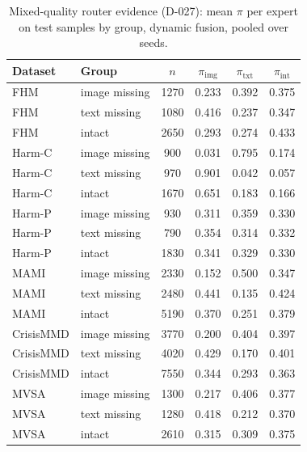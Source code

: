 \begin{table}[t]
\centering
\caption{Mixed-quality router evidence (D-027): mean $\pi$ per expert on test samples by group, dynamic fusion, pooled over seeds.}
\label{tab:mq-router}
\begin{tabular}{llcccc}
\toprule
Dataset & Group & $n$ & $\pi_\mathrm{img}$ & $\pi_\mathrm{txt}$ & $\pi_\mathrm{int}$ \\
\midrule
FHM & image missing & 1270 & 0.233 & 0.392 & 0.375 \\
FHM & text missing & 1080 & 0.416 & 0.237 & 0.347 \\
FHM & intact & 2650 & 0.293 & 0.274 & 0.433 \\
Harm-C & image missing & 900 & 0.031 & 0.795 & 0.174 \\
Harm-C & text missing & 970 & 0.901 & 0.042 & 0.057 \\
Harm-C & intact & 1670 & 0.651 & 0.183 & 0.166 \\
Harm-P & image missing & 930 & 0.311 & 0.359 & 0.330 \\
Harm-P & text missing & 790 & 0.354 & 0.314 & 0.332 \\
Harm-P & intact & 1830 & 0.341 & 0.329 & 0.330 \\
MAMI & image missing & 2330 & 0.152 & 0.500 & 0.347 \\
MAMI & text missing & 2480 & 0.441 & 0.135 & 0.424 \\
MAMI & intact & 5190 & 0.370 & 0.251 & 0.379 \\
CrisisMMD & image missing & 3770 & 0.200 & 0.404 & 0.397 \\
CrisisMMD & text missing & 4020 & 0.429 & 0.170 & 0.401 \\
CrisisMMD & intact & 7550 & 0.344 & 0.293 & 0.363 \\
MVSA & image missing & 1300 & 0.217 & 0.406 & 0.377 \\
MVSA & text missing & 1280 & 0.418 & 0.212 & 0.370 \\
MVSA & intact & 2610 & 0.315 & 0.309 & 0.375 \\
\bottomrule
\end{tabular}
\end{table}
